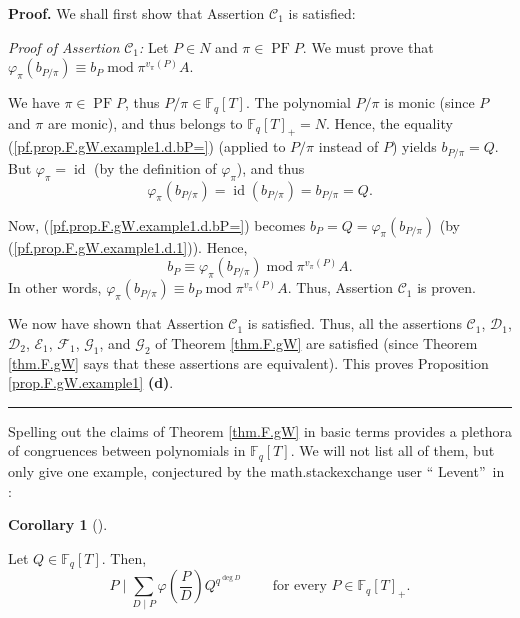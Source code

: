 \documentclass[numbers=enddot,12pt,final,onecolumn,notitlepage]{scrartcl}%
\theoremstyle{definition}
\newtheorem{coro}[theo]{Corollary}
\newenvironment{corollary}[1][]
{\begin{coro}[#1]\begin{leftbar}}
{\end{leftbar}\end{coro}}
\newenvironment{proof}[1][Proof]{\noindent\textbf{#1.} }{\ \rule{0.5em}{0.5em}}
\let\sumnonlimits\sum
\renewcommand{\sum}{\sumnonlimits\limits}
\begin{document}
\begin{proof}
We shall first show that Assertion $\mathcal{C}_{1}$ is satisfied:

\textit{Proof of Assertion }$\mathcal{C}_{1}$\textit{:} Let $P\in N$ and
$\pi\in\operatorname*{PF}P$. We must prove that $\varphi_{\pi}\left(
b_{P/\pi}\right)  \equiv b_{P}\operatorname{mod}\pi^{v_{\pi}\left(  P\right)
}A$.

We have $\pi\in\operatorname*{PF}P$, thus $P/\pi\in\mathbb{F}_{q}\left[
T\right]  $. The polynomial $P/\pi$ is monic (since $P$ and $\pi$ are monic),
and thus belongs to $\mathbb{F}_{q}\left[  T\right]  _{+}=N$. Hence, the
equality (\ref{pf.prop.F.gW.example1.d.bP=}) (applied to $P/\pi$ instead of
$P$) yields $b_{P/\pi}=Q$. But $\varphi_{\pi}=\operatorname*{id}$ (by the
definition of $\varphi_{\pi}$), and thus%
\begin{equation}
\varphi_{\pi}\left(  b_{P/\pi}\right)  =\operatorname*{id}\left(  b_{P/\pi
}\right)  =b_{P/\pi}=Q. \label{pf.prop.F.gW.example1.d.1}%
\end{equation}


Now, (\ref{pf.prop.F.gW.example1.d.bP=}) becomes $b_{P}=Q=\varphi_{\pi}\left(
b_{P/\pi}\right)  $ (by (\ref{pf.prop.F.gW.example1.d.1})). Hence,%
\[
b_{P}\equiv\varphi_{\pi}\left(  b_{P/\pi}\right)  \operatorname{mod}%
\pi^{v_{\pi}\left(  P\right)  }A.
\]
In other words, $\varphi_{\pi}\left(  b_{P/\pi}\right)  \equiv b_{P}%
\operatorname{mod}\pi^{v_{\pi}\left(  P\right)  }A$. Thus, Assertion
$\mathcal{C}_{1}$ is proven.

We now have shown that Assertion $\mathcal{C}_{1}$ is satisfied. Thus, all the
assertions $\mathcal{C}_{1}$, $\mathcal{D}_{1}$, $\mathcal{D}_{2}$,
$\mathcal{E}_{1}$, $\mathcal{F}_{1}$, $\mathcal{G}_{1}$, and $\mathcal{G}_{2}$
of Theorem \ref{thm.F.gW} are satisfied (since Theorem \ref{thm.F.gW} says
that these assertions are equivalent). This proves Proposition
\ref{prop.F.gW.example1} \textbf{(d)}.
\end{proof}

Spelling out the claims of Theorem \ref{thm.F.gW} in basic terms provides a
plethora of congruences between polynomials in $\mathbb{F}_{q}\left[
T\right]  $. We will not list all of them, but only give one example,
conjectured by the math.stackexchange user \textquotedblleft
Levent\textquotedblright\ in \cite{levent}:

\begin{corollary}
\label{cor.F.gW.example1.levent}Let $Q\in\mathbb{F}_{q}\left[  T\right]  $.
Then,%
\[
P\mid\sum_{D\mid P}\varphi\left(  \dfrac{P}{D}\right)  Q^{q^{\deg D}%
}\ \ \ \ \ \ \ \ \ \ \text{for every }P\in\mathbb{F}_{q}\left[  T\right]
_{+}.
\]

\end{corollary}
\end{document}
